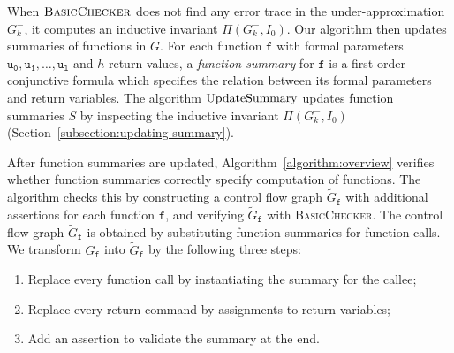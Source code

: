 When $\textsc{BasicChecker}$ does not find any error trace in the
under-approximation $G^-_k$, it computes an inductive
invariant $\Pi (G^-_k, I_0)$. Our algorithm then updates
summaries of functions in $G$. For each function $\mathtt{f}$ with
formal parameters $\mathtt{u_0}, \mathtt{u_1}, \ldots, \mathtt{u_l}$
and $h$ return values, a \emph{function summary} for $\mathtt{f}$ is a
first-order conjunctive formula which specifies the relation between
its formal parameters and return variables. The algorithm
$\textmd{UpdateSummary}$ updates function summaries $S$ by inspecting
the inductive invariant $\Pi (G^-_k, I_0)$
(Section~\ref{subsection:updating-summary}). 

After function summaries are updated, Algorithm~\ref{algorithm:overview} 
verifies whether function summaries correctly specify computation of
functions. The algorithm checks this by constructing a control flow
graph $\tilde{G}_{\mathtt{f}}$ with additional assertions for each
function $\mathtt{f}$, and verifying $\tilde{G}_{\mathtt{f}}$ with
\textsc{BasicChecker}. The control flow graph
$\tilde{G}_{\mathtt{f}}$ is obtained by substituting function
summaries for function calls.
We transform $G_{\mathtt{f}}$ into $\tilde{G}_{\mathtt{f}}$ by the
following three steps:
\begin{enumerate}
\item Replace every function call by instantiating the summary for the
  callee;
\item Replace every return command by assignments to return variables;
\item Add an assertion to validate the summary at the end.
\end{enumerate}
